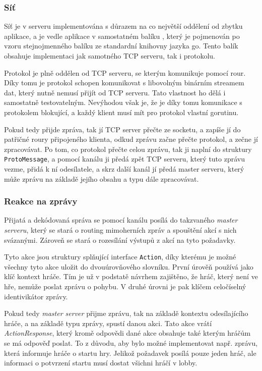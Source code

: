 \documentclass[12pt, a4paper]{article}
\begin{document}
    \subsubsection{Síť}
    Síť je v serveru implementována s důrazem na co největší oddělení od zbytku aplikace, a je vedle aplikace v samostatném balíku , který je pojmenován po vzoru stejnojmenného balíku ze standardní knihovny jazyka go.
    Tento balík obsahuje implementaci jak samotného TCP serveru, tak i protokolu.
    
    Protokol je plně oddělen od TCP serveru, se kterým komunikuje pomocí rour.
    Díky tomu je protokol schopen komunikovat s libovolným binárním streamem dat, který nutně nemusí přijít od TCP serveru.
    Tato vlastnost ho dělá i samostatně testovatelným.
    Nevýhodou však je, že je díky tomu komunikace s protokolem blokující, a každý klient musí mít pro protokol vlastní gorutinu.

    Pokud tedy přijde zpráva, tak jí TCP server přečte ze socketu, a zapíše jí do patřičné roury připojeného klienta, odkud zprávu začne přečte protokol, a zečne jí zpracovávat.
    Po tom, co protokol přečte celou zprávu, tak ji naplní do struktury \texttt{ProtoMessage}, a pomocí kanálu ji předá zpět TCP serveru, který tuto zprávu vezme, přidá k ní odesílatele, a skrz další kanál jí předá master serveru, který může zprávu na základě jejího obsahu a typu dále zpracovávat.

    \subsubsection{Reakce na zprávy}
    Přijatá a dekódovaná správa se pomocí kanálu posílá do takzvaného \textit{master serveru}, který se stará o routing mimoherních zpráv a spouštění akcí s nich svázanými.
    Zároveň se stará o rozesílání výstupů z akcí na tyto požadavky.

    Tyto akce jsou struktury splňující interface \texttt{Action}, díky kterému je možné všechny tyto akce uložit do dvouúrovňového slovníku.
    První úrověň používá jako klíč kontext hráče.
    Tím je už v podstatě návrhem zajištěno, že hráč, který není ve hře, nemůže poslat zprávu o pohybu.
    V druhé úrovni je pak klíčem celočíselný identivikátor zprávy.

    Pokud tedy \textit{master server} přijme zprávu, tak na základě kontextu odesílajícího hráče, a na základě typu zprávy, spustí danou akci.
    Tato akce vrátí \textit{ActionResponse}, který kromě odpovědi dané akce obsahuje také kterým hráčům se má odpověď poslat.
    To z důvodu, aby bylo možné implementovat např. zprávu, která informuje hráče o startu hry.
    Jelikož požadavek posílá pouze jeden hráč, ale informaci o potvrzení startu musí dostat všichni hráčí v lobby.
\end{document}
